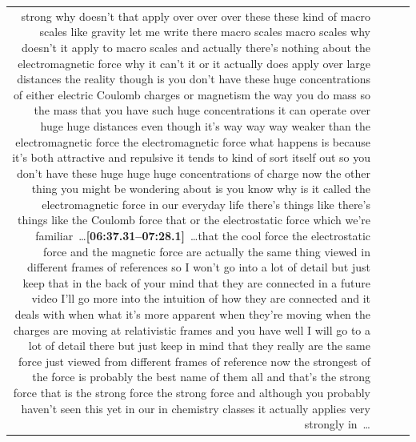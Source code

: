 \documentclass[10pt]{article}
\begin{document}
\begin{tiny}
\begin{longtable}{r p{0.3in} p{1.212in} p{3.8in}}
strong why doesn't that apply over over over these these kind of macro scales like gravity let me write there macro scales macro scales why doesn't it apply to macro scales and actually there's nothing about the electromagnetic force why it can't it or it actually does apply over large distances the reality though is you don't have these huge concentrations of either electric Coulomb charges or magnetism the way you do mass so the mass that you have such huge concentrations it can operate over huge huge distances even though it's way way way weaker than the electromagnetic force the electromagnetic force what happens is because it's both attractive and repulsive it tends to kind of sort itself out so you don't have these huge huge huge concentrations of charge now the other thing you might be wondering about is you know why is it called the electromagnetic force in our everyday life there's things like there's things like the Coulomb force that or the electrostatic force which we're familiar~\ldots\smallskip\newline\textbf{[06:37.31--07:28.1]}~\ldots that the cool force the electrostatic force and the magnetic force are actually the same thing viewed in different frames of references so I won't go into a lot of detail but just keep that in the back of your mind that they are connected in a future video I'll go more into the intuition of how they are connected and it deals with when what it's more apparent when they're moving when the charges are moving at relativistic frames and you have well I will go to a lot of detail there but just keep in mind that they really are the same force just viewed from different frames of reference now the strongest of the force is probably the best name of them all and that's the strong force that is the strong force the strong force and although you probably haven't seen this yet in our in chemistry classes it actually applies very strongly in~\ldots \\

\end{longtable}
\end{tiny}
\end{document}
